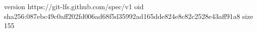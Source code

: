 version https://git-lfs.github.com/spec/v1
oid sha256:087ebc49c0aff202fd006ad68f5d35992ad165dde824e8c82c2528e43aff91a8
size 155
